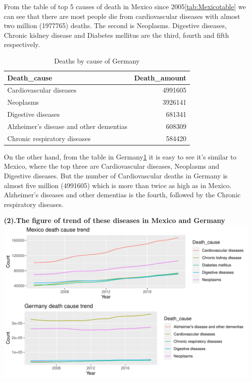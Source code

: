 \documentclass[11pt,a4paper,]{article}
\begin{document}
From the table of top 5 causes of death in Mexico since 2005\ref{tab:Mexicotable} we can see that there are most people die from cardiovascular diseases with almost two million (1977765) deaths. The second is Neoplasms. Digestive diseases, Chronic kidney disease and Diabetes mellitus are the third, fourth and fifth respectively.

\begin{table}

\caption{\label{tab:Germanytable}Deaths by cause of Germany}
\centering
\begin{tabular}[t]{l|r}
\hline
Death\_cause & Death\_amount\\
\hline
Cardiovascular diseases & 4991605\\
\hline
Neoplasms & 3926141\\
\hline
Digestive diseases & 681341\\
\hline
Alzheimer's disease and other dementias & 608309\\
\hline
Chronic respiratory diseases & 584420\\
\hline
\end{tabular}
\end{table}

On the other hand, from the table in Germany\ref{tab:Germanytable} it is easy to see it's similar to Mexico, where the top three are Cardiovascular diseases, Neoplasms and Digestive diseases. But the number of Cardiovascular deaths in Germany is almost five million (4991605) which is more than twice as high as in Mexico. Alzheimer's diseases and other dementias is the fourth, followed by the Chronic respiratory diseases.

\textbf{(2).The figure of trend of these diseases in Mexico and Germany}
\includegraphics{Assignment4_files/figure-latex/MexicoAndGermanyfigure-1.pdf}
\end{document}
